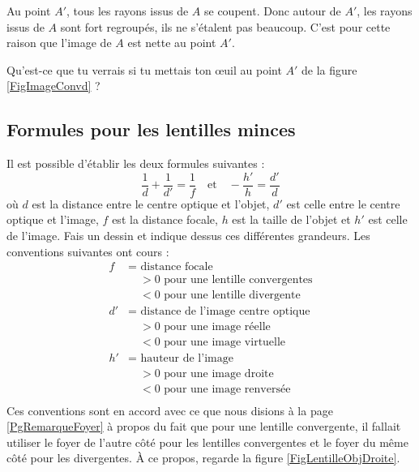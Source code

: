 Au point $A'$, tous les rayons issus de $A$ se coupent. Donc autour de $A'$, les rayons issus de $A$ sont fort \og regroupés\fg, ils ne s'étalent pas beaucoup. C'est pour cette raison que l'image de $A$ est nette au point $A'$. 

\begin{exercice}
Qu'est-ce que tu verrais si tu mettais ton \oe uil au point $A'$ de la figure \ref{FigImageConvd} ?
\end{exercice}

\subsection{Formules pour les lentilles minces}

Il est possible d'établir les deux formules suivantes :
\begin{equation}
  \frac{1}{ d }+\frac{1}{ d' }=\frac{1}{ f }\quad\text{et}\quad -\frac{ h' }{ h }=\frac{ d' }{ d }
\end{equation}
où $d$ est la distance entre le centre optique et l'objet, $d'$ est celle entre le centre optique et l'image, $f$ est la distance focale, $h$ est la taille de l'objet et $h'$ est celle de l'image. Fais un dessin et indique dessus ces différentes grandeurs. Les conventions suivantes ont cours :
\begin{align*}
   f&=\text{ distance focale}\\
	&\quad >0\text{ pour une lentille convergentes}\\
	&\quad <0\text{ pour une lentille divergente}\\
  d'&=\text{ distance de l'image centre optique}\\
	&\quad >0\text{ pour une image réelle}\\
	&\quad <0\text{ pour une image virtuelle}\\
  h'&=\text{ hauteur de l'image}\\
	&\quad >0\text{ pour une image droite}\\
	&\quad <0\text{ pour une image renversée}\\
\end{align*}
Ces conventions sont en accord avec ce que nous disions à la page \ref{PgRemarqueFoyer} à propos du fait que pour une lentille convergente, il fallait utiliser le foyer de l'autre côté pour les lentilles convergentes et le foyer du même côté pour les divergentes. À ce propos, regarde la figure \ref{FigLentilleObjDroite}.

